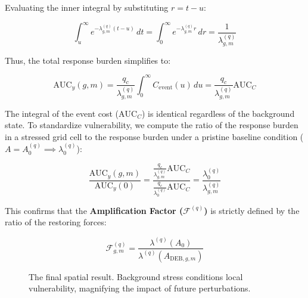 \documentclass[11pt,a4paper]{article}
\begin{document}
Evaluating the inner integral by substituting $r = t - u$:

\begin{equation}
\int_u^\infty e^{-\lambda_{g,m}^{(q)}(t-u)}\,dt = \int_0^\infty e^{-\lambda_{g,m}^{(q)}r}\,dr = \frac{1}{\lambda_{g,m}^{(q)}}
\end{equation}

Thus, the total response burden simplifies to:

\begin{equation}
\text{AUC}_y(g,m) = \frac{q_c}{\lambda_{g,m}^{(q)}} \int_0^\infty C_{\mathrm{event}}(u)\,du = \frac{q_c}{\lambda_{g,m}^{(q)}} \text{AUC}_C
\end{equation}

The integral of the event cost ($\text{AUC}_C$) is identical regardless of the background state. To standardize vulnerability, we compute the ratio of the response burden in a stressed grid cell to the response burden under a pristine baseline condition ($A = A_0^{(q)} \implies \lambda_0^{(q)}$):

\begin{equation}
\frac{\text{AUC}_y(g,m)}{\text{AUC}_y(0)} = \frac{\frac{q_c}{\lambda_{g,m}^{(q)}} \text{AUC}_C}{\frac{q_c}{\lambda_0^{(q)}} \text{AUC}_C} = \frac{\lambda_0^{(q)}}{\lambda_{g,m}^{(q)}}
\end{equation}

This confirms that the \textbf{Amplification Factor ($\mathcal{F}^{(q)}$)} is strictly defined by the ratio of the restoring forces:

\begin{equation}
\boxed{ \mathcal{F}_{g,m}^{(q)} = \frac{\lambda^{(q)}(A_0)}{\lambda^{(q)}(A_{\mathrm{DEB},g,m})} }
\end{equation}

\begin{figure}[H]
\centering
{}
\caption{The final spatial result. Background stress conditions local vulnerability, magnifying the impact of future perturbations.}
\end{figure}
\end{document}
